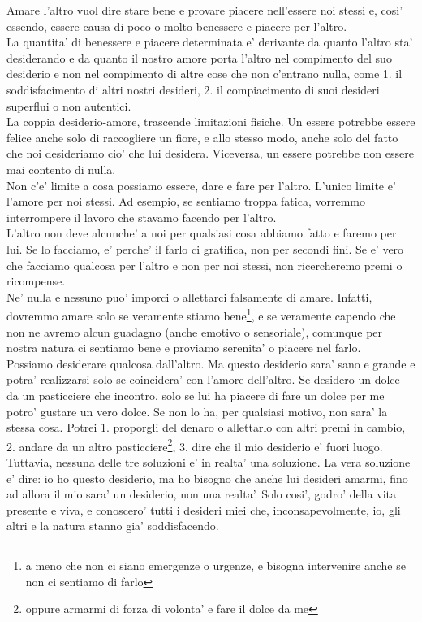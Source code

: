 Amare l'altro vuol dire stare bene e provare piacere nell'essere noi stessi e, cosi' essendo, essere causa di poco o molto benessere e piacere per l'altro.\\
La quantita' di benessere e piacere determinata e' derivante da quanto l'altro sta' desiderando e da quanto il nostro amore porta l'altro nel compimento del suo desiderio e non nel compimento di altre cose che non c'entrano nulla, come 1. il soddisfacimento di altri nostri desideri, 2. il compiacimento di suoi desideri superflui o non autentici. \\
La coppia desiderio-amore, trascende limitazioni fisiche. Un essere potrebbe essere felice anche solo di raccogliere un fiore, e allo stesso modo, anche solo del fatto che noi desideriamo cio' che lui desidera. Viceversa, un essere potrebbe non essere mai contento di nulla. \\
Non c'e' limite a cosa possiamo essere, dare e fare per l'altro. L'unico limite e' l'amore per noi stessi. Ad esempio, se sentiamo troppa fatica, vorremmo interrompere il lavoro che stavamo facendo per l'altro. \\
L'altro non deve alcunche' a noi per qualsiasi cosa abbiamo fatto e faremo per lui. Se lo facciamo, e' perche' il farlo ci gratifica, non per secondi fini. Se e' vero che facciamo qualcosa per l'altro e non per noi stessi, non ricercheremo premi o ricompense.\\
Ne' nulla e nessuno puo' imporci o allettarci falsamente di amare. Infatti, dovremmo amare solo se veramente stiamo bene\footnote{a meno che non ci siano emergenze o urgenze, e bisogna intervenire anche se non ci sentiamo di farlo}, e se veramente capendo che non ne avremo alcun guadagno (anche emotivo o sensoriale), comunque per nostra natura ci sentiamo bene e proviamo serenita' o piacere nel farlo.\\

Possiamo desiderare qualcosa dall'altro. Ma questo desiderio sara' sano e grande e potra' realizzarsi solo se coincidera' con l'amore dell'altro. Se desidero un dolce da un pasticciere che incontro, solo se lui ha piacere di fare un dolce per me potro' gustare un vero dolce. Se non lo ha, per qualsiasi motivo, non sara' la stessa cosa. Potrei 1. proporgli del denaro o allettarlo con altri premi in cambio, 2. andare da un altro pasticciere\footnote{oppure armarmi di forza di volonta' e fare il dolce da me}, 3. dire che il mio desiderio e' fuori luogo. Tuttavia, nessuna delle tre soluzioni e' in realta' una soluzione. La vera soluzione e' dire: io ho questo desiderio, ma ho bisogno che anche lui desideri amarmi, fino ad allora il mio sara' un desiderio, non una realta'. Solo cosi', godro' della vita presente e viva, e conoscero' tutti i desideri miei che, inconsapevolmente, io, gli altri e la natura stanno gia' soddisfacendo.\\

